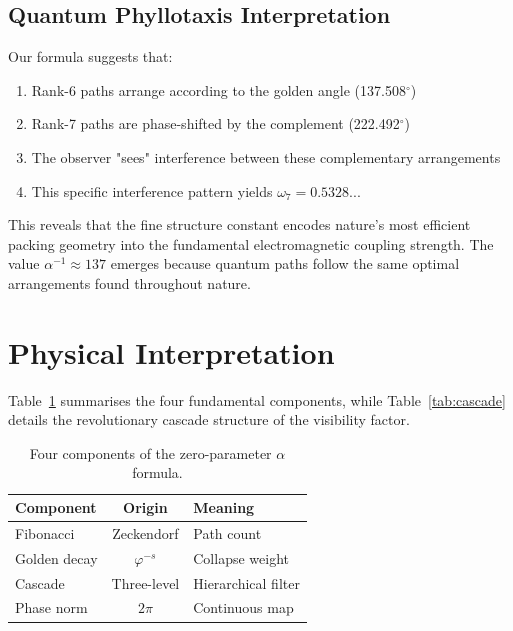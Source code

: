 \documentclass[%
 reprint,
 amsmath,amssymb,
 aps,
 prd,
 10pt,
 nofootinbib,      %
 longbibliography  %
]{revtex4-2}
\theoremstyle{definition}
\theoremstyle{remark}
\begin{document}
\subsection{Quantum Phyllotaxis Interpretation}

Our formula suggests that:
\begin{enumerate}
\item Rank-6 paths arrange according to the golden angle (137.508$^\circ$)
\item Rank-7 paths are phase-shifted by the complement (222.492$^\circ$)
\item The observer "sees" interference between these complementary arrangements
\item This specific interference pattern yields $\omega_7 = 0.5328...$
\end{enumerate}

This reveals that the fine structure constant encodes nature's most efficient packing geometry into the fundamental electromagnetic coupling strength. The value $\alpha^{-1} \approx 137$ emerges because quantum paths follow the same optimal arrangements found throughout nature.

\section{Physical Interpretation}\label{sec:interpretation}

Table~\ref{tab:contributions}
summarises the four fundamental components, while Table~\ref{tab:cascade} details the revolutionary cascade structure of the visibility factor.

\begin{table}[htbp]
  \centering
  \footnotesize
  \begin{tabular}{lcl}
    \toprule
    Component & Origin & Meaning \\
    \midrule
    Fibonacci & Zeckendorf & Path count \\
    Golden decay & $\varphi^{-s}$ & Collapse weight \\
    Cascade & Three-level & Hierarchical filter \\
    Phase norm & $2\pi$ & Continuous map \\
    \bottomrule
  \end{tabular}
  \caption{Four components of the zero-parameter $\alpha$ formula.}
  \label{tab:contributions}
\end{table}
\end{document}
